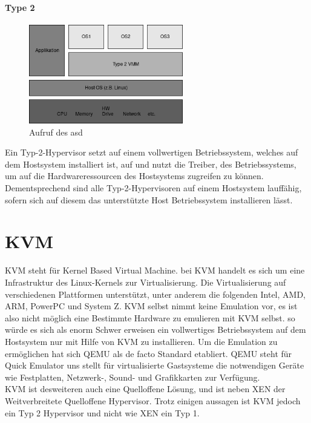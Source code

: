 \documentclass[14pt]{extreport}
\begin{document}
\subsubsection{Type 2}
\begin{figure}
	\begin{center}
		\includegraphics[width=0.6\textwidth]{png/VMMType2.png}
		\caption{Aufruf des asd}
		\label{fig:as}
	\end{center}
\end{figure}
Ein Typ-2-Hypervisor setzt auf einem vollwertigen Betriebssystem, welches auf dem Hostsystem installiert ist, auf und nutzt die Treiber, des Betriebssystems, um auf die Hardwareressourcen des Hostsystems zugreifen zu können. Dementsprechend sind alle Typ-2-Hypervisoren auf einem Hostsystem lauffähig, sofern sich auf diesem das unterstützte Host Betriebssystem installieren lässt.
\chapter{KVM}
KVM steht für Kernel Based Virtual Machine. bei KVM handelt es sich um eine Infrastruktur des Linux-Kernels zur Virtualisierung. Die Virtualisierung auf verschiedenen Plattformen unterstützt, unter anderem die folgenden Intel, AMD, ARM, PowerPC und System Z. KVM selbst nimmt keine Emulation vor, es ist also nicht möglich eine Bestimmte Hardware zu emulieren mit KVM selbst. so würde es sich als enorm Schwer erweisen ein vollwertiges Betriebssystem auf dem Hostsystem nur mit Hilfe von KVM zu installieren. Um die Emulation zu ermöglichen hat sich QEMU als de facto Standard etabliert. QEMU steht für Quick Emulator uns stellt für virtualisierte Gastsysteme die notwendigen Geräte wie Festplatten, Netzwerk-, Sound- und Grafikkarten zur Verfügung.\\
KVM ist desweiteren auch eine Quelloffene Lösung, und ist neben XEN der Weitverbreitete Quelloffene Hypervisor. Trotz einigen aussagen ist KVM jedoch ein Typ 2 Hypervisor und nicht wie XEN ein Typ 1. \cite{website:esxyVergleich}
\end{document}
